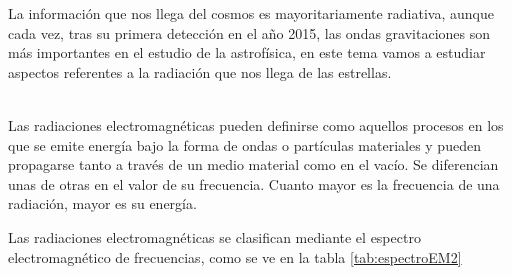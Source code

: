 \documentclass[openany]{book}
\theoremstyle{ucostyle}
\begin{document}
La información que nos llega del cosmos es mayoritariamente radiativa, aunque cada vez, tras su primera detección en el año 2015, las ondas gravitaciones son más importantes en el estudio de la astrofísica, en este tema vamos a estudiar aspectos referentes a la radiación que nos llega de las estrellas. 

\\

Las radiaciones electromagnéticas pueden definirse como aquellos procesos en los que se emite energía bajo la forma de ondas o partículas materiales y pueden propagarse tanto a través de un medio material como en el vacío.
Se diferencian unas de otras en el valor de su frecuencia. Cuanto mayor es la frecuencia de una radiación, mayor es su energía.

Las radiaciones electromagnéticas se clasifican mediante el espectro electromagnético de frecuencias, como se ve en la tabla \ref{tab:espectroEM2}




\begin{table}[h!]
\centering
\renewcommand{\arraystretch}{1.45}
\setlength{\tabcolsep}{14pt}

\caption{\textbf{Espectro electromagnético}}
\label{tab:espectroEM2}

\end{table}
\end{document}
